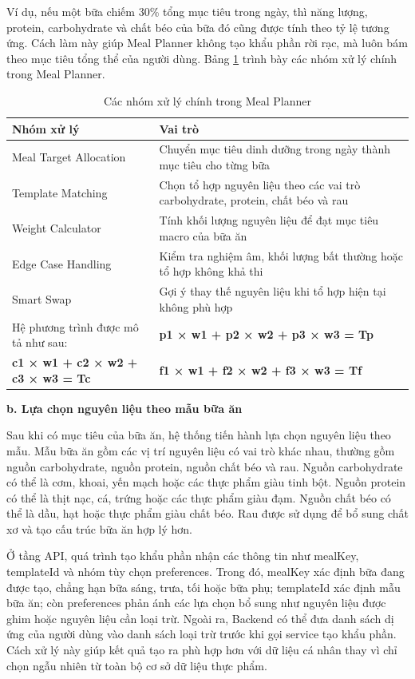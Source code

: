 \documentclass[12pt, a4paper]{report}
\begin{document}
Ví dụ, nếu một bữa chiếm 30\% tổng mục tiêu trong ngày, thì năng lượng, protein, carbohydrate và chất béo của bữa đó cũng được tính theo tỷ lệ tương ứng. Cách làm này giúp Meal Planner không tạo khẩu phần rời rạc, mà luôn bám theo mục tiêu tổng thể của người dùng. Bảng \ref{tab:meal_planner_process} trình bày các nhóm xử lý chính trong Meal Planner.

\begin{longtable}{|>{\raggedright\arraybackslash}p{5cm}|p{10cm}|}
\caption{Các nhóm xử lý chính trong Meal Planner}
\label{tab:meal_planner_process} \\
\hline
\textbf{Nhóm xử lý} & \textbf{Vai trò} \\
\hline
Meal Target Allocation & Chuyển mục tiêu dinh dưỡng trong ngày thành mục tiêu cho từng bữa \\
\hline
Template Matching & Chọn tổ hợp nguyên liệu theo các vai trò carbohydrate, protein, chất béo và rau \\
\hline
Weight Calculator & Tính khối lượng nguyên liệu để đạt mục tiêu macro của bữa ăn \\
\hline
Edge Case Handling & Kiểm tra nghiệm âm, khối lượng bất thường hoặc tổ hợp không khả thi \\
\hline
Smart Swap & Gợi ý thay thế nguyên liệu khi tổ hợp hiện tại không phù hợp \\
\hline
Hệ phương trình được mô tả như sau: & \textbf{p1 × w1 + p2 × w2 + p3 × w3 = Tp} \\
\hline
\textbf{c1 × w1 + c2 × w2 + c3 × w3 = Tc} & \textbf{f1 × w1 + f2 × w2 + f3 × w3 = Tf} \\
\hline
\end{longtable}

\textbf{b. Lựa chọn nguyên liệu theo mẫu bữa ăn}

Sau khi có mục tiêu của bữa ăn, hệ thống tiến hành lựa chọn nguyên liệu theo mẫu. Mẫu bữa ăn gồm các vị trí nguyên liệu có vai trò khác nhau, thường gồm nguồn carbohydrate, nguồn protein, nguồn chất béo và rau. Nguồn carbohydrate có thể là cơm, khoai, yến mạch hoặc các thực phẩm giàu tinh bột. Nguồn protein có thể là thịt nạc, cá, trứng hoặc các thực phẩm giàu đạm. Nguồn chất béo có thể là dầu, hạt hoặc thực phẩm giàu chất béo. Rau được sử dụng để bổ sung chất xơ và tạo cấu trúc bữa ăn hợp lý hơn.

Ở tầng API, quá trình tạo khẩu phần nhận các thông tin như mealKey, templateId và nhóm tùy chọn preferences. Trong đó, mealKey xác định bữa đang được tạo, chẳng hạn bữa sáng, trưa, tối hoặc bữa phụ; templateId xác định mẫu bữa ăn; còn preferences phản ánh các lựa chọn bổ sung như nguyên liệu được ghim hoặc nguyên liệu cần loại trừ. Ngoài ra, Backend có thể đưa danh sách dị ứng của người dùng vào danh sách loại trừ trước khi gọi service tạo khẩu phần. Cách xử lý này giúp kết quả tạo ra phù hợp hơn với dữ liệu cá nhân thay vì chỉ chọn ngẫu nhiên từ toàn bộ cơ sở dữ liệu thực phẩm.
\end{document}
